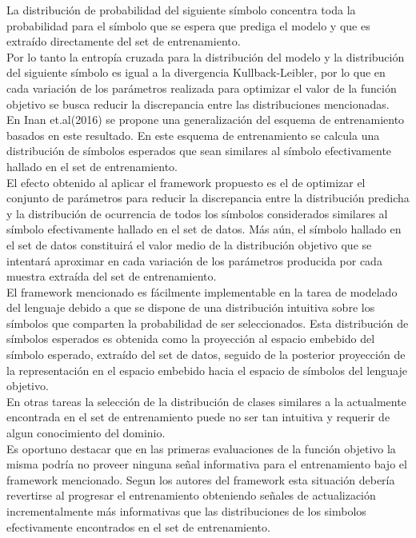 \documentclass{article}
\begin{document}
	La distribución de probabilidad del siguiente símbolo concentra toda la probabilidad para el símbolo que se espera que prediga el modelo y que es extraído directamente del set de entrenamiento.\\
	Por lo tanto la entropía cruzada para la distribución del modelo y la distribución del siguiente símbolo es igual a la divergencia Kullback-Leibler\cite{63WordEmbeddingTyingTheory}, por lo que en cada variación de los parámetros realizada para optimizar el valor de la función objetivo se busca reducir la discrepancia entre las distribuciones mencionadas.\\
	En Inan et.al(2016)\cite{63WordEmbeddingTyingTheory} se propone una generalización del esquema de entrenamiento basados en este resultado. En este esquema de entrenamiento se calcula una distribución de símbolos esperados que sean similares al símbolo efectivamente hallado en el set de entrenamiento. \\
	El efecto obtenido al aplicar el framework propuesto es el de optimizar el conjunto de parámetros para reducir la discrepancia entre la distribución predicha y la distribución de ocurrencia de todos los símbolos considerados similares al símbolo efectivamente hallado en el set de datos. Más aún, el símbolo hallado en el set de datos constituirá el valor medio de la distribución objetivo que se intentará aproximar en cada variación de los parámetros producida por cada muestra extraída del set de entrenamiento.\\
	
	El framework mencionado es fácilmente implementable en la tarea de modelado del lenguaje debido a que se dispone de una distribución intuitiva sobre los símbolos que comparten la probabilidad de ser seleccionados. Esta distribución de símbolos esperados es obtenida como la proyección al espacio embebido del símbolo esperado, extraído del set de datos, seguido de la posterior proyección de la representación en el espacio embebido hacia el espacio de símbolos del lenguaje objetivo. \\
	En otras tareas la selección de la distribución de clases similares a la actualmente encontrada en el set de entrenamiento puede no ser tan intuitiva y requerir de algun conocimiento del dominio.\\
	
	Es oportuno destacar que en las primeras evaluaciones de la función objetivo la misma podría no proveer ninguna señal informativa para el entrenamiento bajo el framework mencionado. Segun los autores del framework esta situación debería revertirse al progresar el entrenamiento obteniendo señales de actualización incrementalmente más informativas que las distribuciones de los simbolos efectivamente encontrados en el set de entrenamiento.
	
\end{document}

